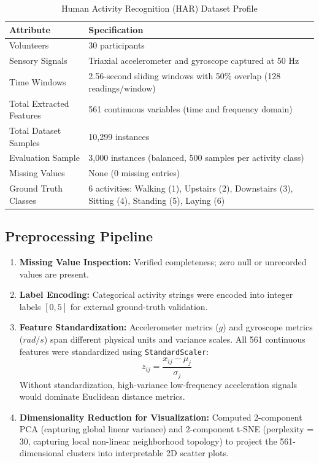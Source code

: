 \documentclass[12pt,a4paper]{article}
\begin{document}
\begin{table}[H]
\centering
\caption{Human Activity Recognition (HAR) Dataset Profile}
\label{tab:har_specs}
\begin{tabular}{|p{5.5cm}|p{9.5cm}|}
\hline
\textbf{Attribute} & \textbf{Specification} \\ \hline
Volunteers & 30 participants \\ \hline
Sensory Signals & Triaxial accelerometer and gyroscope captured at 50 Hz \\ \hline
Time Windows & 2.56-second sliding windows with 50\% overlap (128 readings/window) \\ \hline
Total Extracted Features & 561 continuous variables (time and frequency domain) \\ \hline
Total Dataset Samples & 10,299 instances \\ \hline
Evaluation Sample & 3,000 instances (balanced, 500 samples per activity class) \\ \hline
Missing Values & None (0 missing entries) \\ \hline
Ground Truth Classes & 6 activities: Walking (1), Upstairs (2), Downstairs (3), Sitting (4), Standing (5), Laying (6) \\ \hline
\end{tabular}
\end{table}

\subsection{Preprocessing Pipeline}
\begin{enumerate}
\item \textbf{Missing Value Inspection:} Verified completeness; zero null or unrecorded values are present.
\item \textbf{Label Encoding:} Categorical activity strings were encoded into integer labels $[0, 5]$ for external ground-truth validation.
\item \textbf{Feature Standardization:} Accelerometer metrics ($g$) and gyroscope metrics ($rad/s$) span different physical units and variance scales. All 561 continuous features were standardized using \texttt{StandardScaler}:
\begin{equation}
z_{ij} = \frac{x_{ij} - \mu_j}{\sigma_j}
\end{equation}
Without standardization, high-variance low-frequency acceleration signals would dominate Euclidean distance metrics.
\item \textbf{Dimensionality Reduction for Visualization:} Computed 2-component PCA (capturing global linear variance) and 2-component t-SNE (perplexity = 30, capturing local non-linear neighborhood topology) to project the 561-dimensional clusters into interpretable 2D scatter plots.
\end{enumerate}
\end{document}
